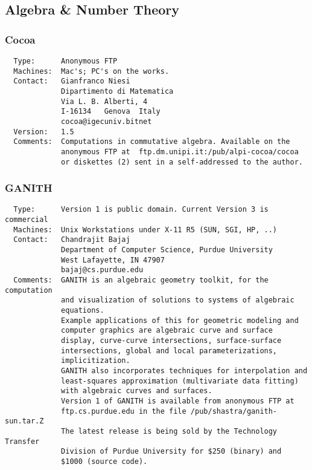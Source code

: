 \documentclass[twoside,11pt]{article}
\begin{document}
\subsection{Algebra \& Number Theory}

\subsubsection{Cocoa}
\begin{verbatim}
  Type:      Anonymous FTP
  Machines:  Mac's; PC's on the works.
  Contact:   Gianfranco Niesi
             Dipartimento di Matematica
             Via L. B. Alberti, 4
             I-16134   Genova  Italy
             cocoa@igecuniv.bitnet
  Version:   1.5
  Comments:  Computations in commutative algebra. Available on the
             anonymous FTP at  ftp.dm.unipi.it:/pub/alpi-cocoa/cocoa
             or diskettes (2) sent in a self-addressed to the author.
\end{verbatim}

\subsubsection{GANITH}
\begin{verbatim}
  Type:      Version 1 is public domain. Current Version 3 is commercial
  Machines:  Unix Workstations under X-11 R5 (SUN, SGI, HP, ..)
  Contact:   Chandrajit Bajaj
             Department of Computer Science, Purdue University
             West Lafayette, IN 47907
             bajaj@cs.purdue.edu
  Comments:  GANITH is an algebraic geometry toolkit, for the computation
             and visualization of solutions to systems of algebraic
             equations.
             Example applications of this for geometric modeling and
             computer graphics are algebraic curve and surface
             display, curve-curve intersections, surface-surface
             intersections, global and local parameterizations,
             implicitization.
             GANITH also incorporates techniques for interpolation and
             least-squares approximation (multivariate data fitting)
             with algebraic curves and surfaces.
             Version 1 of GANITH is available from anonymous FTP at
             ftp.cs.purdue.edu in the file /pub/shastra/ganith-sun.tar.Z
             The latest release is being sold by the Technology Transfer
             Division of Purdue University for $250 (binary) and
             $1000 (source code).
\end{verbatim}
\end{document}
